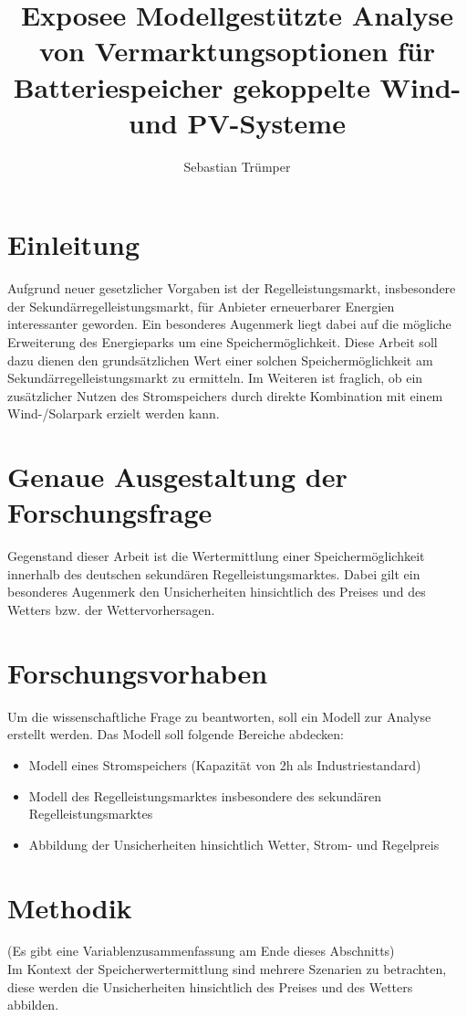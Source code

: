 \documentclass[british,         %
BCOR=2mm,                       %
11pt,                           %
a4paper,						%
oneside,						%
cdgeometry,                     %
toc=chapterentrydotfill,        %
toc=indent,                     %
bibliography=totoc,         	%
listof=totoc,                   %
numbers=noenddot,				%
parskip=full,                   %
cdmath=false					%
]{article}                  %
\title{Exposee Modellgestützte Analyse von Vermarktungsoptionen für Batteriespeicher gekoppelte Wind- und PV-Systeme}
\author{Sebastian Trümper}
\date{ }vcvcdfffc
\begin{document}

\maketitle

\tableofcontents


\section{Einleitung}
Aufgrund neuer gesetzlicher Vorgaben ist der Regelleistungsmarkt, 
insbesondere der Sekundärregelleistungsmarkt, 
für Anbieter erneuerbarer Energien interessanter geworden. Ein besonderes Augenmerk liegt dabei auf die mögliche Erweiterung des Energieparks 
um eine Speichermöglichkeit. Diese Arbeit soll dazu dienen den grundsätzlichen Wert einer solchen Speichermöglichkeit
am Sekundärregelleistungsmarkt zu ermitteln.
Im Weiteren ist fraglich, ob ein zusätzlicher Nutzen des Stromspeichers durch direkte Kombination mit einem 
Wind-/Solarpark erzielt werden kann.


\section{Genaue Ausgestaltung der Forschungsfrage}
Gegenstand dieser Arbeit ist die Wertermittlung einer Speichermöglichkeit innerhalb des deutschen sekundären Regelleistungsmarktes. 
Dabei gilt ein besonderes Augenmerk den Unsicherheiten hinsichtlich des Preises und des Wetters bzw. der Wettervorhersagen.


\section{Forschungsvorhaben}
Um die wissenschaftliche Frage zu beantworten, soll ein Modell zur Analyse erstellt werden. 
Das Modell soll folgende Bereiche abdecken: 
\begin{itemize}
	\item Modell eines Stromspeichers (Kapazität von 2h als Industriestandard)
	\item Modell des Regelleistungsmarktes insbesondere des sekundären Regelleistungsmarktes
	\item Abbildung der Unsicherheiten hinsichtlich Wetter, Strom- und Regelpreis
\end{itemize}



\section{Methodik}
(Es gibt eine Variablenzusammenfassung am Ende dieses Abschnitts)\\
Im Kontext der Speicherwertermittlung sind mehrere Szenarien zu betrachten, 
diese werden die Unsicherheiten hinsichtlich des Preises und des Wetters abbilden.
\end{document}
